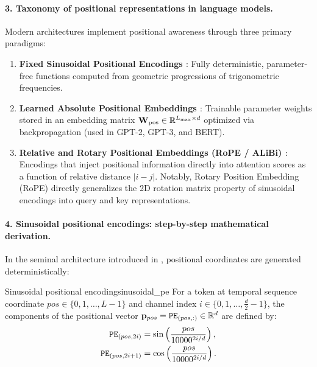 \documentclass[../../main.tex]{subfiles}
\begin{document}
\paragraph{3. Taxonomy of positional representations in language models.}
Modern architectures implement positional awareness through three primary paradigms:
\begin{enumerate}
    \item \textbf{Fixed Sinusoidal Positional Encodings \cite{vaswani2017}}: Fully deterministic, parameter-free functions computed from geometric progressions of trigonometric frequencies.
    \item \textbf{Learned Absolute Positional Embeddings \cite{gehring2017, radford2019, devlin2019}}: Trainable parameter weights stored in an embedding matrix $\mathbf{W}_{\text{pos}} \in \mathbb{R}^{L_{\max} \times d}$ optimized via backpropagation (used in GPT-2, GPT-3, and BERT).
    \item \textbf{Relative and Rotary Positional Embeddings (RoPE / ALiBi) \cite{shaw2018, su2024roformer, press2022alibi}}: Encodings that inject positional information directly into attention scores as a function of relative distance $|i - j|$. Notably, Rotary Position Embedding (RoPE) \cite{su2024roformer} directly generalizes the 2D rotation matrix property of sinusoidal encodings into query and key representations.
\end{enumerate}

\paragraph{4. Sinusoidal positional encodings: step-by-step mathematical derivation.}
In the seminal architecture introduced in \cite{vaswani2017}, positional coordinates are generated deterministically:
\begin{definition}{Sinusoidal positional encoding}{sinusoidal_pe}
For a token at temporal sequence coordinate $pos \in \{0, 1, \dots, L-1\}$ and channel index $i \in \{0, 1, \dots, \frac{d}{2}-1\}$, the components of the positional vector $\mathbf{p}_{pos} = \text{\texttt{PE}}_{(pos, :)} \in \mathbb{R}^d$ are defined by:
\begin{align}
\label{eq:sinusoidal_pe_even}
\text{\texttt{PE}}_{(pos, 2i)} &= \sin\left(\frac{pos}{10000^{2i / d}}\right), \\
\label{eq:sinusoidal_pe_odd}
\text{\texttt{PE}}_{(pos, 2i+1)} &= \cos\left(\frac{pos}{10000^{2i / d}}\right).
\end{align}
\end{definition}
\end{document}
